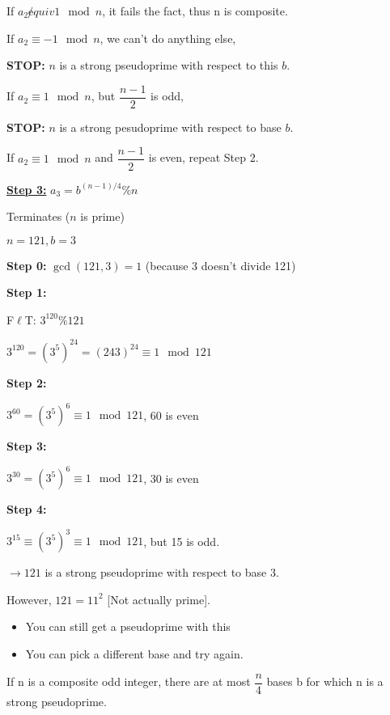 \begin{definition}
If $a_{2} \not equiv 1 \mod n$, it fails the fact, thus n is composite.

If $a_{2} \equiv -1 \mod n$, we can't do anything else,
    
    \quad \textbf{STOP:} $n$ is a strong pseudoprime with respect to this $b$.

If $a_{2} \equiv 1 \mod n$, but $\dfrac{n-1}{2}$ is odd,
    
    \quad \textbf{STOP:} $n$ is a strong pesudoprime with respect to base $b$.
    
If $a_{2} \equiv 1 \mod n$ and $\dfrac{n-1}{2}$ is even, repeat Step 2.

\noindent \textbf{\underline{Step 3:}} $a_{3} = b^{(n-1)/4} \% n$

Terminates ($n$ is prime)


\begin{example}
$n = 121, b = 3$

\textbf{Step 0: } $\gcd(121, 3) = 1$ (because 3 doesn't divide 121)


\textbf{Step 1: }

\quad F$\ell$T: $3^{120} \% 121$

\quad $ 3^{120} = (3^{5})^{24} = (243)^{24} \equiv 1 \mod 121$

\textbf{Step 2: }

\quad $3^{60} = (3^{5})^{6} \equiv 1 \mod 121$, 60 is even

\textbf{Step 3: }

\quad $3^{30} = (3^{5})^{6} \equiv 1 \mod 121$, 30 is even

\textbf{Step 4: }

\quad $3^{15} \equiv (3^{5})^{3} \equiv 1 \mod 121$, but 15 is odd.

$\longrightarrow 121$ is a strong pseudoprime with respect to base 3.

However, $121 = 11^{2}$ [Not actually prime].
\end{example}

\begin{itemize}
\item You can still get a pseudoprime with this
\item You can pick a different base and try again.
\end{itemize}

\noindent \begin{theorem}
If n is a composite odd integer, there are at most $\dfrac{n}{4}$ bases b for which n is a strong pseudoprime.
\end{theorem}


\end{definition}
